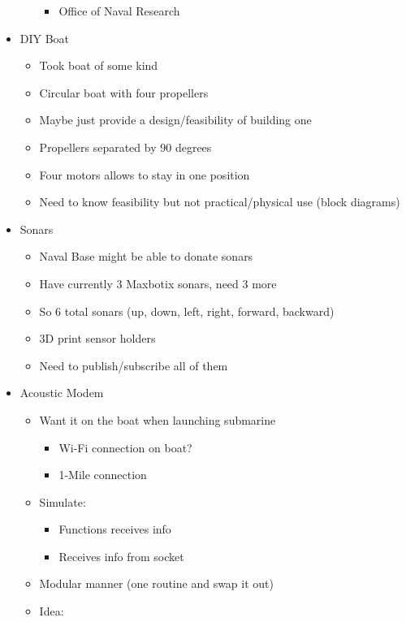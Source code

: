 \documentclass[12pt]{article}
\begin{document}
\begin{itemize}
\begin{itemize}
\begin{itemize}
						\item Office of Naval Research
					\end{itemize}
				\end{itemize}
				\item DIY Boat
				\begin{itemize}
					\item Took boat of some kind
					\item Circular boat with four propellers
					\item Maybe just provide a design/feasibility of building one
					\item Propellers separated by 90 degrees
					\item Four motors allows to stay in one position
					\item Need to know feasibility but not practical/physical use (block diagrams)
				\end{itemize}
				\item Sonars
				\begin{itemize}
					\item Naval Base might be able to donate sonars
					\item Have currently 3 Maxbotix sonars, need 3 more
					\item So 6 total sonars (up, down, left, right, forward, backward)
					\item 3D print sensor holders
					\item Need to publish/subscribe all of them
				\end{itemize}
				\item Acoustic Modem
				\begin{itemize}
					\item Want it on the boat when launching submarine
					\begin{itemize}
						\item Wi-Fi connection on boat?
						\item 1-Mile connection
					\end{itemize}
					\item Simulate:
					\begin{itemize}
						\item Functions receives info
						\item Receives info from socket
					\end{itemize}
					\item Modular manner (one routine and swap it out)
					\item Idea:
					\begin{itemize}

\end{itemize}
\end{itemize}
\end{itemize}
\end{document}
